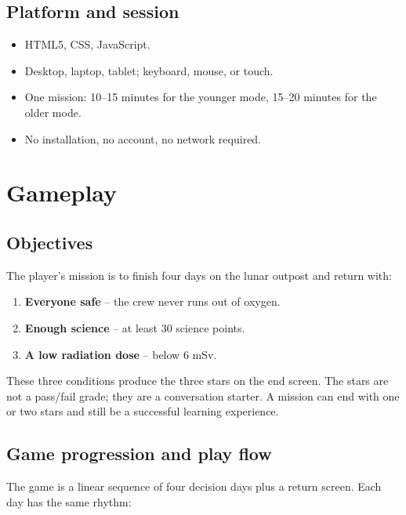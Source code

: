 \documentclass[11pt,a4paper]{article}
\begin{document}
\subsection{Platform and session}

\begin{itemize}
  \item HTML5, CSS, JavaScript.
  \item Desktop, laptop, tablet; keyboard, mouse, or touch.
  \item One mission: 10--15 minutes for the younger mode, 15--20 minutes for the older mode.
  \item No installation, no account, no network required.
\end{itemize}

\section{Gameplay}

\subsection{Objectives}

The player's mission is to finish four days on the lunar outpost and return with:

\begin{enumerate}
  \item \textbf{Everyone safe} -- the crew never runs out of oxygen.
  \item \textbf{Enough science} -- at least 30 science points.
  \item \textbf{A low radiation dose} -- below 6 mSv.
\end{enumerate}

These three conditions produce the three stars on the end screen. The stars are not a pass/fail grade; they are a conversation starter. A mission can end with one or two stars and still be a successful learning experience.

\subsection{Game progression and play flow}

The game is a linear sequence of four decision days plus a return screen. Each day has the same rhythm:
\end{document}
